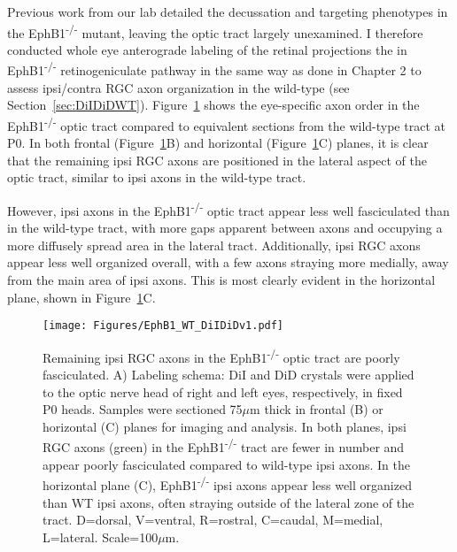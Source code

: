 \label{sec:DiIDiDEphB1}
Previous work from our lab detailed the decussation and targeting phenotypes in the EphB1\textsuperscript{-/-} mutant, leaving the optic tract largely unexamined.
I therefore conducted whole eye anterograde labeling of the retinal projections the in EphB1\textsuperscript{-/-} retinogeniculate pathway in the same way as done in Chapter 2 to assess ipsi/contra RGC axon organization in the wild-type (see Section~\ref{sec:DiIDiDWT}).
Figure~\ref{EphB1WTDiIDiD} shows the eye-specific axon order in the EphB1\textsuperscript{-/-} optic tract compared to equivalent sections from the wild-type tract at P0.
In both frontal (Figure~\ref{EphB1WTDiIDiD}B) and horizontal (Figure~\ref{EphB1WTDiIDiD}C) planes, it is clear that the remaining ipsi RGC axons are positioned in the lateral aspect of the optic tract, similar to ipsi axons in the wild-type tract.

However, ipsi axons in the EphB1\textsuperscript{-/-} optic tract appear less well fasciculated than in the wild-type tract, with more gaps apparent between axons and occupying a more diffusely spread area in the lateral tract.
Additionally, ipsi RGC axons appear less well organized overall, with a few axons straying more medially, away from the main area of ipsi axons.
This is most clearly evident in the horizontal plane, shown in Figure~\ref{EphB1WTDiIDiD}C.
\begin{figure}[hbtp]
    \begin{center}
        \texttt{[image: Figures/EphB1\_WT\_DiIDiDv1.pdf]}
        \caption[Remaining ipsi RGC axons in the EphB1\textsuperscript{-/-} optic tract are poorly fasciculated.]
        {Remaining ipsi RGC axons in the EphB1\textsuperscript{-/-} optic tract are poorly fasciculated.
        A) Labeling schema: DiI and DiD crystals were applied to the optic nerve head of right and left eyes, respectively, in fixed P0 heads.
        Samples were sectioned 75$\mu$m thick in frontal (B) or horizontal (C) planes for imaging and analysis.
        In both planes, ipsi RGC axons (green) in the EphB1\textsuperscript{-/-} tract are fewer in number and appear poorly fasciculated compared to wild-type ipsi axons.
        In the horizontal plane (C), EphB1\textsuperscript{-/-} ipsi axons appear less well organized than WT ipsi axons, often straying outside of the lateral zone of the tract.
        D=dorsal, V=ventral, R=rostral, C=caudal, M=medial, L=lateral.
        Scale=100$\mu$m.
        }
        \label{EphB1WTDiIDiD}
    \end{center}
\end{figure}

